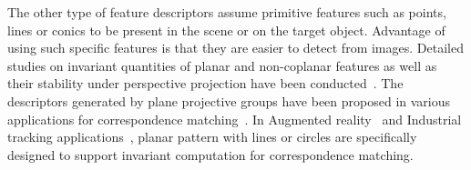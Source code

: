 \documentclass{bmvc2k}
\def\etal{\emph{et al}\bmvaOneDot}
\begin{document}
\par 
The other type of feature descriptors assume primitive features such as points, lines or conics to be present in the scene or on the target object. 
Advantage of using such specific features is that they are easier to detect from images.
Detailed studies on invariant quantities of planar and non-coplanar features as well as their stability under perspective projection have been conducted~\cite{forsyth_91,gros_projective_1992}.
The descriptors generated by plane projective groups have been proposed in various applications for correspondence matching~\cite{Matsunaga2000,uchiyama_random_2011,ying_camera_2007}.
In Augmented reality~\cite{uchiyama_random_2011,van_rhijn_optical_2004} and Industrial tracking applications~\cite{AICON}, planar pattern with lines or circles are specifically designed to support invariant computation for correspondence matching.  
\end{document}
